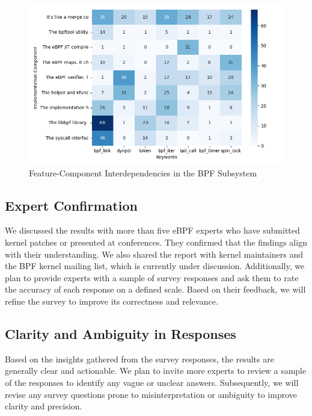\begin{figure}[ht]
    \centering
    \includegraphics[width=\linewidth]{feature-analysis/heatmap_bpf_keywords_vs_components.png}
    \caption{Feature-Component Interdependencies in the BPF Subsystem}
    \label{fig:feature_component_heatmap}
\end{figure}


\subsection{Expert Confirmation}

We discussed the results with more than five eBPF experts who have submitted kernel patches or presented at conferences. They confirmed that the findings align with their understanding. We also shared the report with kernel maintainers and the BPF kernel mailing list, which is currently under discussion. Additionally, we plan to provide experts with a sample of survey responses and ask them to rate the accuracy of each response on a defined scale. Based on their feedback, we will refine the survey to improve its correctness and relevance.

\subsection{Clarity and Ambiguity in Responses}

Based on the insights gathered from the survey responses, the results are generally clear and actionable. We plan to invite more experts to review a sample of the responses to identify any vague or unclear answers. Subsequently, we will revise any survey questions prone to misinterpretation or ambiguity to improve clarity and precision.

